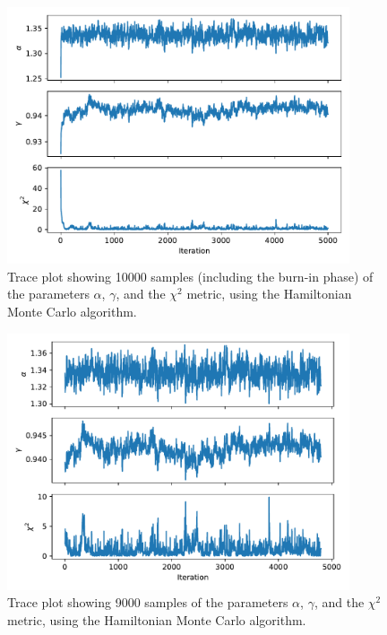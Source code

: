 \documentclass{article}
\begin{document}
\begin{figure}
    \centering
    \includegraphics[width=0.9\textwidth]{figs/hmc.pdf}
    \caption{Trace plot showing 10000 samples (including the burn-in phase) of the parameters $\alpha$, $\gamma$, and the $\chi^2$ metric, using the Hamiltonian Monte Carlo algorithm.}
    \label{fig:hmc}
\end{figure}
\begin{figure}
    \centering
    \includegraphics[width=0.9\textwidth]{figs/hmc_burnin.pdf}
    \caption{Trace plot showing 9000 samples of the parameters $\alpha$, $\gamma$, and the $\chi^2$ metric, using the Hamiltonian Monte Carlo algorithm.}
    \label{fig:hmc_burnin}
\end{figure}
\end{document}
